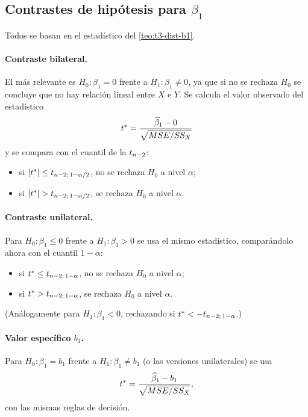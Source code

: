 \subsection{Contrastes de hipótesis para \texorpdfstring{$\beta_1$}{beta1}}

Todos se basan en el estadístico del \cref{teo:t3-dist-b1}.

\paragraph{Contraste bilateral.} El más relevante es $H_0\colon\beta_1=0$ frente a
$H_1\colon\beta_1\neq0$, ya que si no se rechaza $H_0$ se concluye que no hay relación lineal
entre $X$ e $Y$. Se calcula el valor observado del estadístico
\[
  t^* = \frac{\widehat{\beta}_1-0}{\sqrt{MSE/SS_X}}
\]
y se compara con el cuantil de la $t_{n-2}$:
\begin{itemize}
  \item si $|t^*|\le t_{n-2;\,1-\alpha/2}$, no se rechaza $H_0$ a nivel $\alpha$;
  \item si $|t^*|>\tq{n-2}{1-\alpha/2}$, se rechaza $H_0$ a nivel $\alpha$.
\end{itemize}

\paragraph{Contraste unilateral.} Para $H_0\colon\beta_1\le0$ frente a $H_1\colon\beta_1>0$ se usa
el mismo estadístico, comparándolo ahora con el cuantil $1-\alpha$:
\begin{itemize}
  \item si $t^*\le t_{n-2;\,1-\alpha}$, no se rechaza $H_0$ a nivel $\alpha$;
  \item si $t^*>t_{n-2;\,1-\alpha}$, se rechaza $H_0$ a nivel $\alpha$.
\end{itemize}
(Análogamente para $H_1\colon\beta_1<0$, rechazando si $t^*<-t_{n-2;\,1-\alpha}$.)

\paragraph{Valor específico $b_1$.} Para $H_0\colon\beta_1=b_1$ frente a $H_1\colon\beta_1\neq b_1$
(o las versiones unilaterales) se usa
\[
  t^* = \frac{\widehat{\beta}_1-b_1}{\sqrt{MSE/SS_X}},
\]
con las mismas reglas de decisión.

